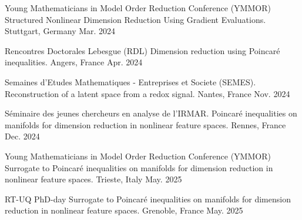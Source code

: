 \begin{cvpresentations}
\cvpresentation
{Young Mathematicians in Model Order Reduction Conference (YMMOR)} %
{Structured Nonlinear Dimension Reduction Using Gradient Evaluations.} %
{Stuttgart, Germany} %
{Mar. 2024} %


\cvpresentation
{Rencontres Doctorales Lebesgue (RDL)} %
{Dimension reduction using Poincaré inequalities.} %
{Angers, France} %
{Apr. 2024} %


\cvpresentation
{Semaines d'Etudes Mathematiques - Entreprises et Societe (SEMES).} %
{Reconstruction of a latent space from a redox signal.} %
{Nantes, France} %
{Nov. 2024} %


\cvpresentation
{S\'eminaire des jeunes chercheurs en analyse de l'IRMAR.} %
{Poincaré inequalities on manifolds for dimension reduction in nonlinear feature spaces.} %
{Rennes, France} %
{Dec. 2024} %


\cvpresentation
{Young Mathematicians in Model Order Reduction Conference (YMMOR)} %
{Surrogate to Poincaré inequalities on manifolds for dimension reduction in nonlinear feature spaces.} %
{Trieste, Italy} %
{May. 2025} %

\end{cvpresentations}
\begin{cvpresentations}


\cvpresentation
{RT-UQ PhD-day} %
{Surrogate to Poincaré inequalities on manifolds for dimension reduction in nonlinear feature spaces.} %
{Grenoble, France} %
{May. 2025} %


\end{cvpresentations}


